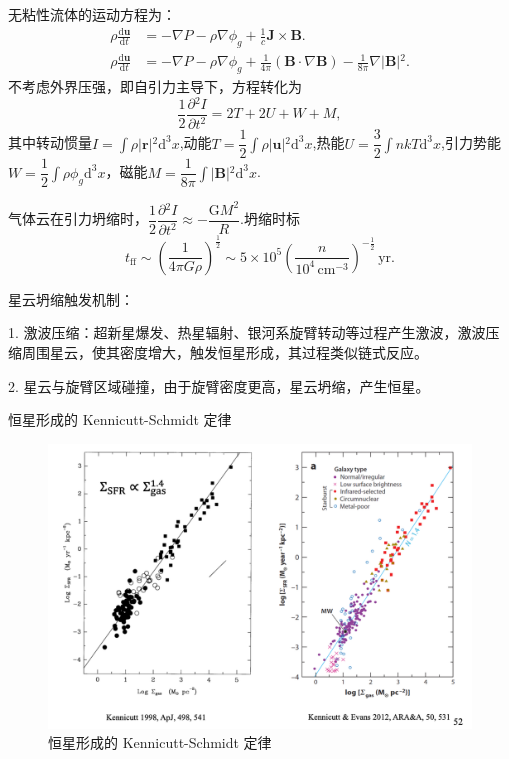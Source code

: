 \documentclass[../天体物理基础.tex]{subfiles}
\begin{document}
无粘性流体的运动方程为：
\begin{align}
\rho\frac{\mathrm{d}\boldsymbol{u}}{\mathrm{d}t}&=-\nabla{}P-\rho\nabla\phi_{g}+\frac{1}{c}\boldsymbol{J}\times\boldsymbol{B}.\\
\rho\frac{\mathrm{d}\boldsymbol{u}}{\mathrm{d}t}&=-\nabla P-\rho\nabla\phi_{g}+\frac{1}{4\pi}\left(\boldsymbol{B}\cdot\nabla \boldsymbol{B}\right)-\frac{1}{8\pi}\nabla{}\left\vert{}\boldsymbol{B}\right\vert{}^{2}.
\end{align}
不考虑外界压强，即自引力主导下，方程转化为
\begin{equation}
\frac{1}{2}\frac{\partial{}^{2}I}{\partial{}t^{2}}=2T+2U+W+M,
\end{equation}
其中转动惯量$I=\int\rho\left\vert{}\boldsymbol{r}\right\vert{}^{2}\mathrm{d}^{3}x$,动能$T=\dfrac{1}{2}\int\rho\left\vert{}\boldsymbol{u}\right\vert{}^2\mathrm{d}^{3}x$,热能$U=\dfrac{3}{2}\int nkT\mathrm{d}^3x$,引力势能$W=\dfrac{1}{2}\int\rho\phi_{g}\mathrm{d}^{3}x$，磁能$M=\dfrac{1}{8\pi}\int\left\vert{}\boldsymbol{B}\right\vert{}^{2}\mathrm{d}^{3}x$.

气体云在引力坍缩时，$\dfrac{1}{2}\dfrac{\partial{}^{2}I}{\partial{}t^{2}}\approx-\dfrac{\text{G}M^{2}}{R}$.坍缩时标
\begin{equation}
t_{\text{ff}}\sim\left(\frac{1}{4\pi{}G\rho}\right)^{\frac{1}{2}}\sim5\times10^{5}\left(\frac{n}{10^{4}\,\mathrm{cm^{-3}}}\right)^{-\frac{1}{2}}\,\mathrm{yr}.
\end{equation}

星云坍缩触发机制：

1. 激波压缩：超新星爆发、热星辐射、银河系旋臂转动等过程产生激波，激波压缩周围星云，使其密度增大，触发恒星形成，其过程类似链式反应。

2. 星云与旋臂区域碰撞，由于旋臂密度更高，星云坍缩，产生恒星。

恒星形成的 Kennicutt-Schmidt 定律
\begin{figure}[!htbp]
\centering
\includegraphics[width=13cm]{figures/figure3_2.png}
\captionsetup{justification=raggedright, singlelinecheck=false}
\caption{恒星形成的 Kennicutt-Schmidt 定律}
\label{}
\end{figure}
\end{document}
